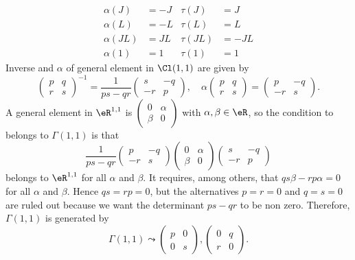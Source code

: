 \[
	\begin{aligned}
		\alpha(J)  & =-J & \tau(J)  & =J   \\
		\alpha(L)  & =-L & \tau(L)  & =L   \\
		\alpha(JL) & =JL & \tau(JL) & =-JL \\
		\alpha(1)  & =1  & \tau(1)  & =1
	\end{aligned}
\]
Inverse and $\alpha$ of general element in $\Cl(1,1)$ are given by
\[
	\begin{pmatrix}
		p & q \\r&s
	\end{pmatrix}^{-1}=
	\frac{1}{ ps-qr }\begin{pmatrix}
		s & -q \\-r&p
	\end{pmatrix},\quad
	\alpha\begin{pmatrix}
		p & q \\r&s
	\end{pmatrix}=
	\begin{pmatrix}
		p & -q \\-r&s
	\end{pmatrix}.
\]
A general element in $\eR^{1,1}$ is $\begin{pmatrix}
		0 & \alpha \\\beta&0
	\end{pmatrix}$ with $\alpha,\beta\in\eR$, so the condition to belongs to $\Gamma(1,1)$ is that
\[
	\frac{1}{ ps-qr }\begin{pmatrix}
		p & -q \\-r&s
	\end{pmatrix}
	\begin{pmatrix}
		0 & \alpha \\\beta&0
	\end{pmatrix}
	\begin{pmatrix}
		s & -q \\-r&p
	\end{pmatrix}
\]
belongs to $\eR^{1,1}$ for all $\alpha$ and $\beta$. It requires, among others, that $qs\beta-rp\alpha=0$ for all $\alpha$ and $\beta$. Hence $qs=rp=0$, but the alternatives $p=r=0$ and $q=s=0$ are ruled out because we want the determinant $ps-qr$ to be non zero. Therefore, $\Gamma(1,1)$ is generated by
\[
	\Gamma(1,1)\leadsto
	\begin{pmatrix}
		p & 0 \\0&s
	\end{pmatrix},\begin{pmatrix}
		0 & q \\r&0
	\end{pmatrix}.
\]
